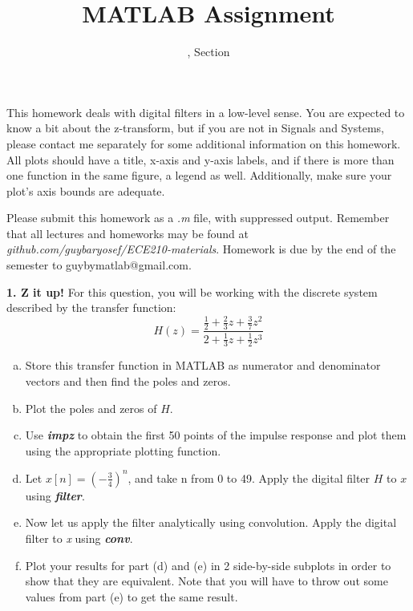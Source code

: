 \documentclass[11pt]{article}
\title{MATLAB Assignment \Homework}
\author{\Session, Section \Section}
\date{}
\makeatletter
\def\MyEmail{guybymatlab@gmail.com}
\makeatother
\begin{document}
\maketitle
This homework deals with digital filters in a low-level sense.
You are expected to know a bit about the z-transform,
but if you are not in Signals and Systems,
please contact me separately for some additional information on this homework.
All plots should have a title, x-axis and y-axis labels,
and if there is more than one function in the same figure, a legend as well.
Additionally, make sure your plot's axis bounds are adequate. 

Please submit this homework as a \textit{.m} file, 
with suppressed output.
Remember that all lectures and homeworks may be found at 
\textit{github.com/guybaryosef/ECE210-materials}.
Homework is due by the end of the semester to \MyEmail.

\noindent
\newline
\textbf{1. Z it up!}
For this question,
you will be working with the discrete system described by the transfer function: 
$$H(z) = \frac{\frac{1}{2}+\frac{2}{3}z+\frac{3}{7}z^2}{2+\frac{1}{3}z+\frac{1}{2}z^3}$$
\begin{enumerate}[a.]
    \item Store this transfer function in MATLAB as numerator and denominator vectors and
    then find the poles and zeros.
    
    \item Plot the poles and zeros of $H$.

    \item Use \textit{\textbf{impz}} to obtain the first 50 points of the impulse response
    and plot them using the appropriate plotting function. 
    
    \item Let $x[n] = (-\frac{3}{4})^n$, and take n from 0 to 49.
    Apply the digital filter $H$ to $x$ using \textit{\textbf{filter}}. 
    
    \item Now let us apply the filter analytically using convolution.
    Apply the digital filter to \textit{x} using \textit{\textbf{conv}}.
    
    \item Plot your results for part (d) and (e) in 2 side-by-side subplots in order to
    show that they are equivalent. Note that you will have to throw out some values from
    part (e) to get the same result.


\end{enumerate}
\end{document}
